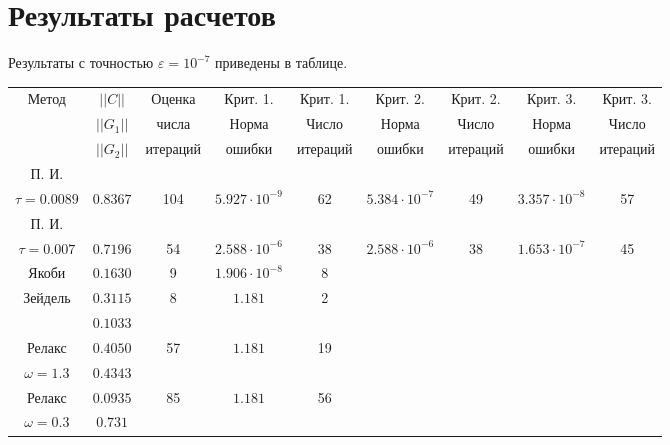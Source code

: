\documentclass[12pt, a4paper]{article}
\begin{document}
\section{Результаты расчетов}
Результаты с точностью $\varepsilon = 10^{-7}$ приведены в таблице.
\noindent\begin{center}
\hspace*{-25mm}\begin{tabular}{|c|c|c|c|c|c|c|c|c|}
\hline
Метод & $||C||$  & Оценка  & Крит. 1.  & Крит. 1. & Крит. 2.  &Крит. 2. & Крит. 3.& Крит. 3.  \\
&$||G_1||$ & числа &Норма&  Число  & Норма & Число &  Норма& Число  \\
& $||G_2||$ &итераций & ошибки &  итераций & ошибки & итераций &ошибки & итераций \\
\hline
П. И. &&&&&&&& \\
$\tau =0{.}0089$ &$0{.}8367$&104&$5{.}927\cdot 10^{-9}$&62&$5{.}384\cdot10^{-7}$&49&$3{.}357\cdot10^{-8}$&57 \\
\hline
П. И. &&&&&&&&\\
$\tau =0{.}007$ &$0{.}7196$&54&$2{.}588\cdot10^{-6}$&38&$2{.}588\cdot10^{-6}$&38&$1{.}653\cdot10^{-7}$&45 \\
\hline
Якоби &$0{.}1630$&9&$1{.}906\cdot10^{-8}$&8&&&& \\
\hline
Зейдель&$0{.}3115$&8&$1{.}181$&2&&&& \\
&$0{.}1033$&&&&&&& \\
\hline
Релакс &$0{.}4050$&57&$1{.}181$&19&&&& \\
$\omega =1.3$ &$0{.}4343$&&&&&&& \\
\hline
Релакс &$0{.}0935$&85&$1{.}181$&56&&&& \\
$\omega =0.3$ &$0{.}731$&&&&&&& \\
\hline
\end{tabular}
\end{center}
\newpage
\end{document}
